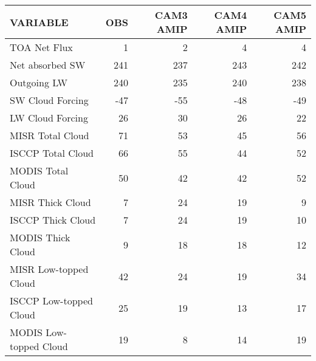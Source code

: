 \begin{tabular}{lrrrr}
\hline
                VARIABLE &                      OBS &                CAM3 AMIP &                CAM4 AMIP &                CAM5 AMIP \\ \hline
            TOA Net Flux &                        1 &                        2 &                        4 &                        4 \\
         Net absorbed SW &                      241 &                      237 &                      243 &                      242 \\
             Outgoing LW &                      240 &                      235 &                      240 &                      238 \\
        SW Cloud Forcing &                      -47 &                      -55 &                      -48 &                      -49 \\
        LW Cloud Forcing &                       26 &                       30 &                       26 &                       22 \\
        MISR Total Cloud &                       71 &                       53 &                       45 &                       56 \\
       ISCCP Total Cloud &                       66 &                       55 &                       44 &                       52 \\
       MODIS Total Cloud &                       50 &                       42 &                       42 &                       52 \\
        MISR Thick Cloud &                        7 &                       24 &                       19 &                        9 \\
       ISCCP Thick Cloud &                        7 &                       24 &                       19 &                       10 \\
       MODIS Thick Cloud &                        9 &                       18 &                       18 &                       12 \\
   MISR Low-topped Cloud &                       42 &                       24 &                       19 &                       34 \\
  ISCCP Low-topped Cloud &                       25 &                       19 &                       13 &                       17 \\
  MODIS Low-topped Cloud &                       19 &                        8 &                       14 &                       19 \\

\end{tabular}
